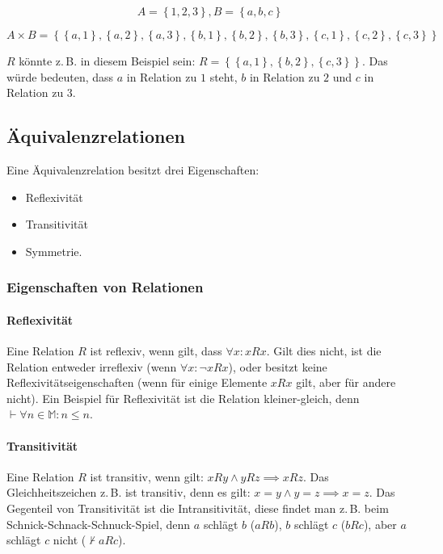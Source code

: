 \documentclass{scrartcl}
\begin{document}
\begin{equation}
	A = \left\{1, 2, 3\right\}, B = \left\{a, b, c\right\}
\end{equation}

\begin{equation}
	A \times B = \left\{
		\left\{a, 1\right\}, \left\{a, 2\right\}, \left\{a, 3\right\},
		\left\{b, 1\right\}, \left\{b, 2\right\}, \left\{b, 3\right\},
		\left\{c, 1\right\}, \left\{c, 2\right\}, \left\{c, 3\right\}
	\right\}
\end{equation}

$R$ könnte z.\,B. in diesem Beispiel sein: $R = \left\{
	\left\{a, 1\right\}, \left\{b, 2\right\}, \left\{c, 3\right\}
\right\}$. Das würde bedeuten, dass $a$ in Relation zu $1$ steht, $b$ in Relation zu
$2$ und $c$ in Relation zu $3$.

\subsection{Äquivalenzrelationen}

Eine Äquivalenzrelation besitzt drei Eigenschaften:

\begin{itemize}
	\item Reflexivität
	\item Transitivität
	\item Symmetrie.
\end{itemize}

\subsubsection{Eigenschaften von Relationen}

\paragraph{Reflexivität} Eine Relation $R$ ist reflexiv, wenn gilt, dass $\forall x: xRx$. Gilt dies nicht, ist die Relation entweder irreflexiv (wenn $\forall x: \lnot xRx$), oder 
besitzt keine Reflexivitätseigenschaften (wenn für einige Elemente $xRx$ gilt, aber für andere nicht).
Ein Beispiel für Reflexivität ist die Relation kleiner-gleich, denn $\vdash \forall n \in \mathbb{M}: n \leq n$.

\paragraph{Transitivität} Eine Relation $R$ ist transitiv, wenn gilt: $xRy \wedge yRz \implies xRz$. Das Gleichheitszeichen z.\,B. ist transitiv, denn
es gilt: $x = y \wedge y = z \implies x = z$. Das Gegenteil von Transitivität ist die Intransitivität, diese findet man z.\,B. beim Schnick-Schnack-Schnuck-Spiel,
denn $a$ schlägt $b$ ($aRb$), $b$ schlägt $c$ ($bRc$), aber $a$ schlägt $c$ nicht ($\not\vdash aRc$).
\end{document}
